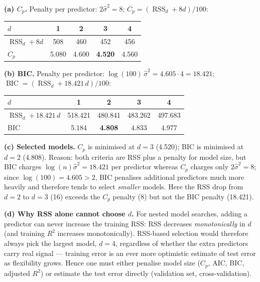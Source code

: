 \documentclass[11pt,a4paper]{article}
\begin{document}
\ifdefined\withsolutions
\begin{solutionbox}
\textbf{(a) $C_p$.} Penalty per predictor: $2\hat{\sigma}^2=8$; $C_p=(\operatorname{RSS}_d+8d)/100$:
\begin{center}
\begin{tabular}{lcccc}
\toprule
$d$ & 1 & 2 & 3 & 4\\
\midrule
$\operatorname{RSS}_d+8d$ & 508 & 460 & 452 & 456\\
$C_p$ & 5.080 & 4.600 & \textbf{4.520} & 4.560\\
\bottomrule
\end{tabular}
\end{center}

\medskip
\textbf{(b) BIC.} Penalty per predictor: $\log(100)\,\hat{\sigma}^2=4.605\cdot 4=18.421$;
$\operatorname{BIC}=(\operatorname{RSS}_d+18.421\,d)/100$:
\begin{center}
\begin{tabular}{lcccc}
\toprule
$d$ & 1 & 2 & 3 & 4\\
\midrule
$\operatorname{RSS}_d+18.421\,d$ & 518.421 & 480.841 & 483.262 & 497.683\\
BIC & 5.184 & \textbf{4.808} & 4.833 & 4.977\\
\bottomrule
\end{tabular}
\end{center}

\medskip
\textbf{(c) Selected models.}
$C_p$ is minimised at $d=3$ (4.520); BIC is minimised at $d=2$ (4.808).
Reason: both criteria are RSS plus a penalty for model size, but BIC charges
$\log(n)\hat{\sigma}^2=18.421$ per predictor whereas $C_p$ charges only
$2\hat{\sigma}^2=8$; since $\log(100)=4.605>2$, BIC penalises additional predictors much
more heavily and therefore tends to select \emph{smaller} models. Here the RSS drop from
$d=2$ to $d=3$ (16) exceeds the $C_p$ penalty (8) but not the BIC penalty (18.421).

\medskip
\textbf{(d) Why RSS alone cannot choose $d$.}
For nested model searches, adding a predictor can never increase the training RSS: RSS
decreases \emph{monotonically} in $d$ (and training $R^2$ increases monotonically).
RSS-based selection would therefore always pick the largest model, $d=4$, regardless of
whether the extra predictors carry real signal --- training error is an ever more
optimistic estimate of test error as flexibility grows. Hence one must either penalise
model size ($C_p$, AIC, BIC, adjusted $R^2$) or estimate the test error directly
(validation set, cross-validation).
\end{solutionbox}
\fi
\end{document}
